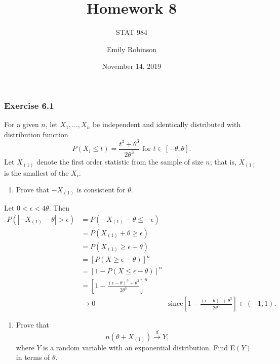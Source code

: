\documentclass[12pt,]{article}
\title{Homework 8}
\subtitle{STAT 984}
\author{Emily Robinson}
\date{November 14, 2019}
\providecommand{\tightlist}{%
  \setlength{\itemsep}{0pt}\setlength{\parskip}{0pt}}
\begin{document}
\maketitle

\hypertarget{exercise-6.1}{%
\subsubsection{Exercise 6.1}\label{exercise-6.1}}

For a given \(n\), let \(X_1,...,X_n\) be independent and identically
distributed with distribution function
\[P(X_i\le t) = \frac{t^3+\theta^3}{2\theta^3} \text{ for } t\in[-\theta,\theta].\]
Let \(X_{(1)}\) denote the first order statistic from the sample of size
\(n\); that is, \(X_{(1)}\) is the smallest of the \(X_i\).

\begin{enumerate}
\def\labelenumi{(\alph{enumi})}
\tightlist
\item
  Prove that \(-X_{(1)}\) is consistent for \(\theta.\)
\end{enumerate}

Let \(0 < \epsilon < 4\theta.\) Then \begin{align*}
P(|-X_{(1)}-\theta|>\epsilon) & = P(-X_{(1)}-\theta \le -\epsilon)\\
& = P(X_{(1)}+\theta \ge \epsilon)\\
& = P(X_{(1)}\ge \epsilon - \theta)\\
& = [P(X \ge \epsilon - \theta)]^n\\
& = [1 - P(X \le \epsilon - \theta)]^n\\
& = \left[1 - \frac{(\epsilon - \theta)^3 + \theta^3}{2\theta^3}\right]^n\\
& \rightarrow 0 & \text{since}  \left[1 - \frac{(\epsilon - \theta)^3 + \theta^3}{2\theta^3}\right] \in (-1, 1).
\end{align*}

\begin{enumerate}
\def\labelenumi{(\alph{enumi})}
\setcounter{enumi}{1}
\tightlist
\item
  Prove that \[n(\theta+X_{(1)})\overset{d}\rightarrow Y,\] where \(Y\)
  is a random variable with an exponential distribution. Find E\((Y)\)
  in terms of \(\theta\).
\end{enumerate}
\end{document}
